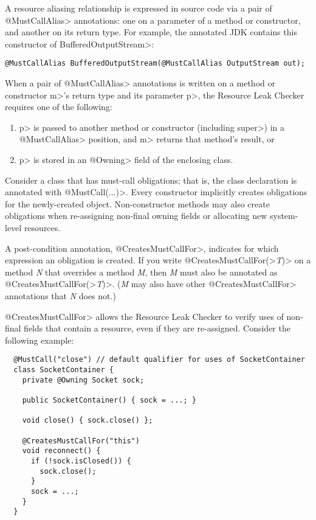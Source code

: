 A resource aliasing relationship is expressed in source code via a pair of \<@MustCallAlias> annotations:
one on a parameter of a method or constructor, and another on its return type.
For example, the annotated JDK contains this constructor of \<BufferedOutputStream>:
\begin{Verbatim}
@MustCallAlias BufferedOutputStream(@MustCallAlias OutputStream out);
\end{Verbatim}

When a pair of \<@MustCallAlias> annotations is written on a method or constructor \<m>'s return type
and its parameter \<p>, the Resource Leak Checker requires one of the following:
\begin{enumerate}
\item \<p> is passed to another method or constructor (including \<super>) in a
  \<@MustCallAlias> position, and \<m> returns that method's result, or
\item \<p> is stored in an \<@Owning> field of the enclosing class.
\end{enumerate}



Consider a class that has must-call obligations; that is, the class
declaration is annotated with \<@MustCall(...)>.
Every constructor implicitly creates obligations for the newly-created object.
Non-constructor methods may also create obligations
when re-assigning non-final owning fields or allocating
new system-level resources.

A post-condition annotation,
\<@CreatesMustCallFor>,
indicates for which expression an obligation is created.
If you write \<@CreatesMustCallFor(>\emph{T}\<)> on a method \emph{N} that
overrides a method \emph{M}, then \emph{M} must also be annotated as
\<@CreatesMustCallFor(>\emph{T}\<)>.  (\emph{M} may also have other
\<@CreatesMustCallFor> annotations that \emph{N} does not.)

\<@CreatesMustCallFor> allows the Resource Leak Checker to verify uses of non-final fields
that contain a resource, even if they are re-assigned. Consider
the following example:

\begin{verbatim}
  @MustCall("close") // default qualifier for uses of SocketContainer
  class SocketContainer {
    private @Owning Socket sock;

    public SocketContainer() { sock = ...; }

    void close() { sock.close() };

    @CreatesMustCallFor("this")
    void reconnect() {
      if (!sock.isClosed()) {
        sock.close();
      }
      sock = ...;
    }
  }
\end{verbatim}

